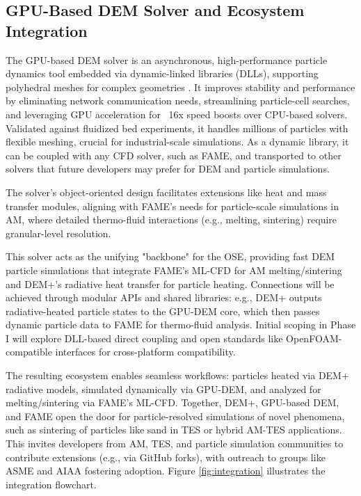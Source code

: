 \documentclass[11pt]{article}
\begin{document}
\subsection*{GPU-Based DEM Solver and Ecosystem Integration}
The GPU-based DEM solver is an asynchronous, high-performance particle dynamics tool embedded via dynamic-linked libraries (DLLs), supporting polyhedral meshes for complex geometries \cite{kianimoqadamAsynchronousGPUbasedSolver2024}. It improves stability and performance by eliminating network communication needs, streamlining particle-cell searches, and leveraging GPU acceleration for ~16x speed boosts over CPU-based solvers. Validated against fluidized bed experiments, it handles millions of particles with flexible meshing, crucial for industrial-scale simulations. As a dynamic library, it can be coupled with any CFD solver, such as FAME, and transported to other solvers that future developers may prefer for DEM and particle simulations.

The solver's object-oriented design facilitates extensions like heat and mass transfer modules, aligning with FAME's needs for particle-scale simulations in AM, where detailed thermo-fluid interactions (e.g., melting, sintering) require granular-level resolution.

This solver acts as the unifying "backbone" for the OSE, providing fast DEM particle simulations that integrate FAME's ML-CFD for AM melting/sintering and DEM+'s radiative heat transfer for particle heating. Connections will be achieved through modular APIs and shared libraries: e.g., DEM+ outputs radiative-heated particle states to the GPU-DEM core, which then passes dynamic particle data to FAME for thermo-fluid analysis. Initial scoping in Phase I will explore DLL-based direct coupling and open standards like OpenFOAM-compatible interfaces for cross-platform compatibility.

The resulting ecosystem enables seamless workflows: particles heated via DEM+ radiative models, simulated dynamically via GPU-DEM, and analyzed for melting/sintering via FAME's ML-CFD. Together, DEM+, GPU-based DEM, and FAME open the door for particle-resolved simulations of novel phenomena, such as sintering of particles like sand in TES or hybrid AM-TES applications. This invites developers from AM, TES, and particle simulation communities to contribute extensions (e.g., via GitHub forks), with outreach to groups like ASME and AIAA fostering adoption. Figure \ref{fig:integration} illustrates the integration flowchart.
\end{document}
